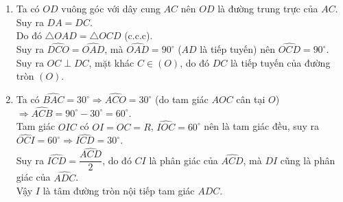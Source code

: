 \begin{bt}
{\begin{enumerate}
{\begin{tikzpicture}[line join = round, line cap = round, >=stealth, scale=0.7]
				
				\end{tikzpicture}
			}
			\item Ta có $OD$ vuông góc với dây cung $AC$ nên 
			$OD$ là đường trung trực của $AC$. Suy ra $DA = DC$.\\
			Do đó $\triangle OAD = \triangle OCD$ (c.c.c).\\
			Suy ra $\widehat{DCO}=\widehat{OAD}$, mà $\widehat{OAD}=90^\circ$ ($AD$ là tiếp tuyến) nên $\widehat{OCD}=90^\circ$.\\
			Suy ra $OC \perp DC$, mặt khác $C \in (O)$, do đó $DC$ là tiếp tuyến của đường tròn $(O)$.
			\item Ta có $\widehat{BAC}=30^\circ \Rightarrow \widehat{ACO}=30^\circ$ (do tam giác $AOC$ cân tại $O$) $\Rightarrow \widehat{ACB}=90^\circ - 30^\circ =60^\circ$.\\
			Tam giác $OIC$ có $OI=OC = R$, $\widehat{IOC}=60^\circ$ nên là tam giác đều,
			suy ra $\widehat{OCI}=60^\circ \Rightarrow \widehat{ICD}=30^\circ$.\\
			Suy ra $\widehat{ICD}=\dfrac{\widehat{ACD}}{2}$, do đó $CI$ là phân giác của $\widehat{ACD}$,
			mà $DI$ cũng là phân giác của $\widehat{ADC}$.\\
			Vậy $I$ là tâm đường tròn nội tiếp tam giác $ADC$.
		\end{enumerate}
	}
\end{bt}

